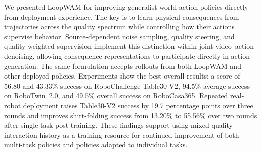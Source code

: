 
We presented LoopWAM for improving generalist world-action policies directly from deployment experience.
The key is to learn physical consequences from trajectories across the quality spectrum while controlling how their actions supervise behavior.
Source-dependent noise sampling, quality steering, and quality-weighted supervision implement this distinction within joint video--action denoising, allowing consequence representations to participate directly in action generation.
The same formulation accepts rollouts from both LoopWAM and other deployed policies. Experiments show the best overall results: a score of 56.80 and 43.33\% success on RoboChallenge Table30-V2, 94.5\% average success on RoboTwin~2.0, and 49.5\% overall success on RoboCasa365.
Repeated real-robot deployment raises Table30-V2 success by 19.7 percentage points over three rounds and improves shirt-folding success from 13.20\% to 55.56\% over two rounds after single-task post-training.
These findings support using mixed-quality interaction history as a training resource for continued improvement of both multi-task policies and policies adapted to individual tasks.

